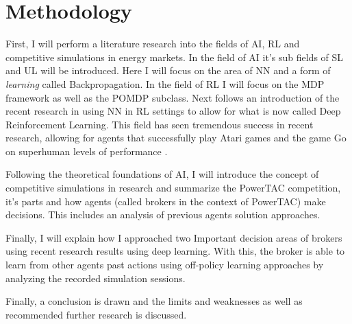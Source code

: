 \section{Methodology}
First, I will perform a literature research into the fields of \ac{AI}, \ac{RL} and competitive simulations in energy
markets. In the field of AI
it's sub fields of \ac {SL}  and \ac {UL}  will be introduced. Here I will focus on the area of \ac{NN} and a form of
\emph{learning}  called Backpropagation. In the field of \ac{RL} I will focus on the \ac{MDP} framework as well as the
\ac{POMDP} subclass.  Next follows an introduction of the recent research in using \ac{NN} in \ac{RL} settings to allow
for what is now called Deep Reinforcement Learning. This field has seen tremendous success in recent research, allowing
for agents that successfully play Atari games and the game Go on superhuman levels of performance 
\citep{proximalpolicyopt, silver2016mastering}.


Following the theoretical foundations of \ac{AI},  I will introduce the concept of competitive simulations in research
and summarize the \ac{PowerTAC} competition, it's parts and how agents (called brokers in the context of \ac{PowerTAC})
make decisions. This includes an analysis of previous agents solution approaches. 

Finally, I will explain how I approached two Important decision areas of brokers using recent research results using
deep learning. With this, the broker is able to learn from other agents past actions using off-policy learning
approaches by analyzing the recorded simulation sessions. 

Finally, a conclusion is drawn and the limits and weaknesses as well as recommended further research is discussed.
